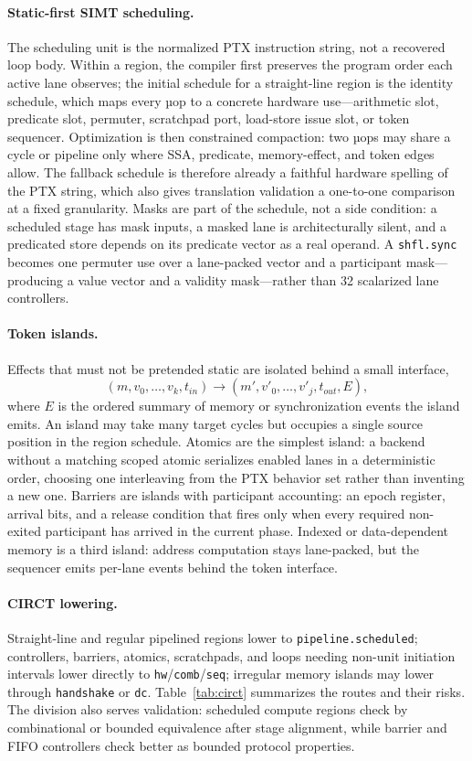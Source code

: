 \documentclass[sigplan,nonacm]{acmart}
\begin{document}
\paragraph{Static-first SIMT scheduling.} The scheduling unit is the
normalized PTX instruction string, not a recovered loop body.  Within a
region, the compiler first preserves the program order each active lane
observes; the initial schedule for a straight-line region is the identity
schedule, which maps every µop to a concrete hardware use---arithmetic slot,
predicate slot, permuter, scratchpad port, load-store issue slot, or token
sequencer.  Optimization is then constrained compaction: two µops may share
a cycle or pipeline only where SSA, predicate, memory-effect, and token
edges allow.  The fallback schedule is therefore already a faithful
hardware spelling of the PTX string, which also gives translation validation
a one-to-one comparison at a fixed granularity.  Masks are part of the
schedule, not a side condition: a scheduled stage has mask inputs, a masked
lane is architecturally silent, and a predicated store depends on its
predicate vector as a real operand.  A \texttt{shfl.sync} becomes one
permuter use over a lane-packed vector and a participant mask---producing a
value vector and a validity mask---rather than 32 scalarized lane
controllers.

\paragraph{Token islands.} Effects that must not be pretended static are
isolated behind a small interface,
\[
  (m, v_0,\ldots,v_k, t_{in}) \rightarrow
  (m', v'_0,\ldots,v'_j, t_{out}, E),
\]
where $E$ is the ordered summary of memory or synchronization events the
island emits.  An island may take many target cycles but occupies a single
source position in the region schedule.  Atomics are the simplest island: a
backend without a matching scoped atomic serializes enabled lanes in a
deterministic order, choosing one interleaving from the PTX behavior set
rather than inventing a new one.  Barriers are islands with participant
accounting: an epoch register, arrival bits, and a release condition that
fires only when every required non-exited participant has arrived in the
current phase.  Indexed or data-dependent memory is a third island: address
computation stays lane-packed, but the sequencer emits per-lane events
behind the token interface.

\paragraph{CIRCT lowering.} Straight-line and regular pipelined regions
lower to \texttt{pipeline.scheduled}; controllers, barriers, atomics,
scratchpads, and loops needing non-unit initiation intervals lower directly
to \texttt{hw}/\texttt{comb}/\texttt{seq}; irregular memory islands may
lower through \texttt{handshake} or \texttt{dc}.  Table~\ref{tab:circt}
summarizes the routes and their risks.  The division also serves
validation: scheduled compute regions check by combinational or bounded
equivalence after stage alignment, while barrier and FIFO controllers check
better as bounded protocol properties.
\end{document}
